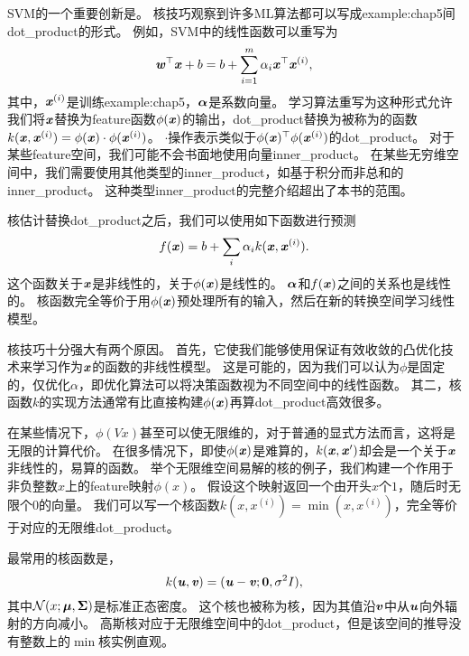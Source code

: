 \gls{SVM}的一个重要创新是。
核技巧观察到许多\gls{ML}算法都可以写成\gls{example:chap5}间\gls{dot_product}的形式。
例如，\gls{SVM}中的线性函数可以重写为
\begin{equation}
    \boldsymbol{\mathit{w}}^\top \boldsymbol{\mathit{x}} + b = b + \sum_{i=1}^m \alpha_i \boldsymbol{\mathit{x}}^\top \boldsymbol{\mathit{x}}^{(i)} ,
\end{equation}
其中，$\boldsymbol{\mathit{x}}^{(i)}$是训练\gls{example:chap5}，$\boldsymbol{\alpha}$是系数向量。
学习算法重写为这种形式允许我们将$\boldsymbol{\mathit{x}}$替换为\gls{feature}函数$\phi(\boldsymbol{\mathit{x}})$的输出，\gls{dot_product}替换为被称为的函数$k(\boldsymbol{\mathit{x}}, \boldsymbol{\mathit{x}}^{(i)}) = \phi(\boldsymbol{\mathit{x}})\cdot \phi(\boldsymbol{\mathit{x}}^{(i)})$。
$\cdot$操作表示类似于$\phi(\boldsymbol{\mathit{x}})^\top \phi(\boldsymbol{\mathit{x}}^{(i)})$的\gls{dot_product}。
对于某些\gls{feature}空间，我们可能不会书面地使用向量\gls{inner_product}。
在某些无穷维空间中，我们需要使用其他类型的\gls{inner_product}，如基于积分而非总和的\gls{inner_product}。
这种类型\gls{inner_product}的完整介绍超出了本书的范围。

核估计替换\gls{dot_product}之后，我们可以使用如下函数进行预测
\begin{equation}
    f(\boldsymbol{\mathit{x}}) = b + \sum_i \alpha_i k(\boldsymbol{\mathit{x}}, \boldsymbol{\mathit{x}}^{(i)}) .
\end{equation}
这个函数关于$\boldsymbol{\mathit{x}}$是非线性的，关于$\phi(\boldsymbol{\mathit{x}})$是线性的。
$\boldsymbol{\alpha}$和$f(\boldsymbol{\mathit{x}})$之间的关系也是线性的。
核函数完全等价于用$\phi(\boldsymbol{\mathit{x}})$预处理所有的输入，然后在新的转换空间学习线性模型。

核技巧十分强大有两个原因。
首先，它使我们能够使用保证有效收敛的凸优化技术来学习作为$\boldsymbol{\mathit{x}}$的函数的非线性模型。
这是可能的，因为我们可以认为$\phi$是固定的，仅优化$\alpha$，即优化算法可以将决策函数视为不同空间中的线性函数。
其二，核函数$k$的实现方法通常有比直接构建$\phi(\boldsymbol{\mathit{x}})$再算\gls{dot_product}高效很多。

在某些情况下，$\phi(Vx)$甚至可以使无限维的，对于普通的显式方法而言，这将是无限的计算代价。
在很多情况下，即使$\phi(\boldsymbol{\mathit{x}})$是难算的，$k(\boldsymbol{\mathit{x}},\boldsymbol{\mathit{x}}')$却会是一个关于$\boldsymbol{\mathit{x}}$非线性的，易算的函数。
举个无限维空间易解的核的例子，我们构建一个作用于非负整数$x$上的\gls{feature}映射$\phi(x)$。
假设这个映射返回一个由开头$x$个$1$，随后时无限个$0$的向量。
我们可以写一个核函数$k(x,x^{(i)}) = \min(x, x^{(i)})$，完全等价于对应的无限维\gls{dot_product}。


最常用的核函数是，
\begin{equation}
    k(\boldsymbol{\mathit{u}}, \boldsymbol{\mathit{v}}) = \mathcal(\boldsymbol{\mathit{u}} - \boldsymbol{\mathit{v}}; \mathbf{0}, \sigma^2 I) ,
\end{equation}
其中$\mathcal{N}(x; \boldsymbol{\mu}, \boldsymbol{\Sigma})$是标准正态密度。
这个核也被称为核，因为其值沿$\boldsymbol{\mathit{v}}$中从$\boldsymbol{\mathit{u}}$向外辐射的方向减小。
高斯核对应于无限维空间中的\gls{dot_product}，但是该空间的推导没有整数上的$\min$核实例直观。

